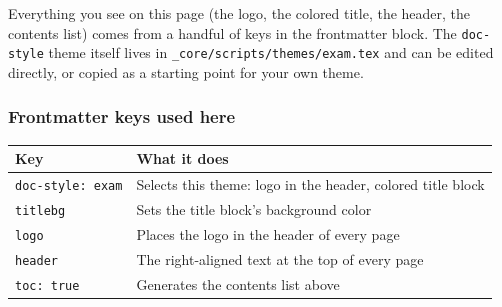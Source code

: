 \documentclass[
  11pt,
]{article}
\newcounter{none} %
\begin{document}
Everything you see on this page (the logo, the colored title, the
header, the contents list) comes from a handful of keys in the
frontmatter block. The \texttt{doc-style} theme itself lives in
\texttt{\_core/scripts/themes/exam.tex} and can be edited directly, or
copied as a starting point for your own theme.

\subsubsection{Frontmatter keys used
here}\label{frontmatter-keys-used-here}

{\def\LTcaptype{none} %
\begin{longtable}[]{@{}
  >{\raggedright\arraybackslash}p{}
  >{\raggedright\arraybackslash}p{}@{}}
\toprule\noalign{}
\begin{minipage}[b]{\linewidth}\raggedright
Key
\end{minipage} & \begin{minipage}[b]{\linewidth}\raggedright
What it does
\end{minipage} \\
\midrule\noalign{}
\endhead
\bottomrule\noalign{}
\endlastfoot
\texttt{doc-style:\ exam} & Selects this theme: logo in the header,
colored title block \\
\texttt{titlebg} & Sets the title block’s background color \\
\texttt{logo} & Places the logo in the header of every page \\
\texttt{header} & The right-aligned text at the top of every page \\
\texttt{toc:\ true} & Generates the contents list above \\
\end{longtable}
}
\end{document}
